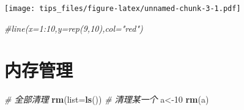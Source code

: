 \documentclass[hyperref,]{ctexart}
\newenvironment{Shaded}{\begin{snugshade}}{\end{snugshade}}
\newcommand{\KeywordTok}[1]{\textcolor[rgb]{0.13,0.29,0.53}{\textbf{#1}}}
\newcommand{\DataTypeTok}[1]{\textcolor[rgb]{0.13,0.29,0.53}{#1}}
\newcommand{\DecValTok}[1]{\textcolor[rgb]{0.00,0.00,0.81}{#1}}
\newcommand{\CommentTok}[1]{\textcolor[rgb]{0.56,0.35,0.01}{\textit{#1}}}
\newcommand{\NormalTok}[1]{#1}
\begin{document}
\texttt{[image: tips\_files/figure-latex/unnamed-chunk-3-1.pdf]}

\begin{Shaded}
\begin{Highlighting}[]
\CommentTok{#line(x=1:10,y=rep(9,10),col="red")}
\end{Highlighting}
\end{Shaded}

\section{内存管理}

\begin{Shaded}
\begin{Highlighting}[]
\CommentTok{# 全部清理}
\KeywordTok{rm}\NormalTok{(}\DataTypeTok{list=}\KeywordTok{ls}\NormalTok{())}
\CommentTok{# 清理某一个}
\NormalTok{a<-}\DecValTok{10}
\KeywordTok{rm}\NormalTok{(a)}
\end{Highlighting}
\end{Shaded}
\end{document}
